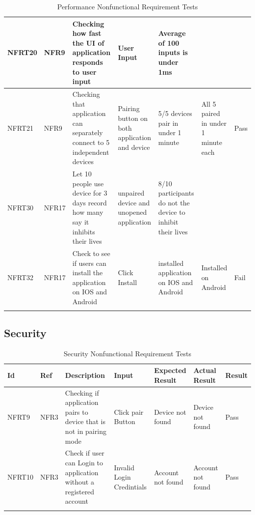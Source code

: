 \documentclass[12pt, titlepage]{article}
\begin{document}
\begin{longtable}{|p{1.4cm}|p{1cm}|p{3cm}|p{1.5cm}|p{2.5cm}|p{2cm}|p{1.2cm}|}
  NFRT20       & NFR9          & Checking how fast the UI of application responds to user input   &User Input & Average of 100 inputs is under 1ms&                                                                                             & \cellcolor[HTML]{FFFFFF}{\color[HTML]{F8A102} TBD}  \\ \hline
  NFRT21       & NFR9          & Checking that application can separately connect to 5 independent devices&Pairing button on both application and device& 5/5 devices pair in under 1 minute & All 5 paired in under 1 minute each              &{\color[HTML]{32CB00} Pass}                          \\ \hline           
  NFRT30       & NFR17         & Let 10 people use device for 3 days record how many say it inhibits their lives &unpaired device and unopened application & 8/10 participants do not the device to inhibit their lives &                       &\cellcolor[HTML]{FFFFFF}{\color[HTML]{F8A102} TBD}    \\ \hline           
  NFRT32       & NFR17         & Check to see if users can install the application on IOS and Android& Click Install & installed application on IOS and Android&Installed on Android          &{\color[HTML]{FE0000} Fail}                                                       \\ \hline
  \caption{Performance Nonfunctional Requirement Tests}
  \label{performanceNonfunctionalRequirementTests}
\end{longtable}

\subsection{Security}

\begin{longtable}{|p{1.4cm}|p{1cm}|p{3cm}|p{1.5cm}|p{2.5cm}|p{2cm}|p{1.2cm}|}
  \endfirsthead
  \endhead
  \hline
  \textbf{Id} & \textbf{Ref} & \textbf{Description}                                                         & \textbf{Input}                                    & \textbf{Expected Result}    & \textbf{Actual Result}                          & \textbf{Result}                                     \\ \hline
  NFRT9        & NFR3          & Checking if application pairs to device that is not in pairing mode              & Click pair Button & Device not found & Device not found & {\color[HTML]{32CB00} Pass}                         \\ \hline
  NFRT10        & NFR3          & Check if user can Login to application without a registered account           & Invalid Login Credintials   &  Account not found      & Account not found    & {\color[HTML]{32CB00} Pass}                         \\ \hline
  \caption{Security Nonfunctional Requirement Tests}
  \label{securityNonfunctionalRequirementTests}
\end{longtable}
\end{document}
